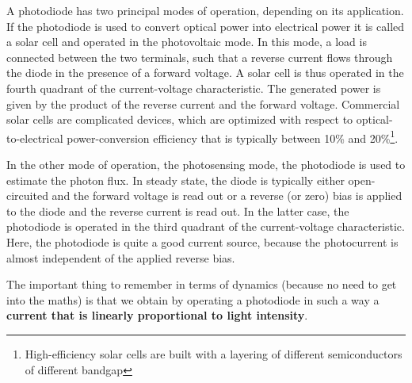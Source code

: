 A photodiode has two principal modes of operation, depending on its application. If the photodiode is used to convert optical power into electrical power it is called a solar cell and operated in the photovoltaic mode. In this mode, a load is connected between the two terminals, such that a reverse current flows through the diode in the presence of a forward voltage. A solar cell is thus operated in the fourth quadrant of the current-voltage characteristic. The generated power is given by the product of the reverse current and the
forward voltage. Commercial solar cells are complicated devices, which are
optimized with respect to optical-to-electrical power-conversion efficiency that
is typically between 10\% and 20\%\footnote{High-efficiency solar cells are built with a layering of different semiconductors of different bandgap}.

In the other mode of operation, the photosensing mode, the photodiode is used to estimate the photon flux. In steady state, the diode is typically either open-circuited and the forward voltage is read out or a reverse (or zero) bias is applied to the diode and the reverse current is read out. In the latter case, the photodiode is operated in the third quadrant of the current-voltage characteristic. Here, the photodiode is quite a good current source, because the photocurrent is almost independent of the applied reverse bias.

The important thing to remember in terms of dynamics (because no need to get into the maths) is that we obtain by operating a photodiode in such a way a \textbf{current that is linearly proportional to light intensity}.

